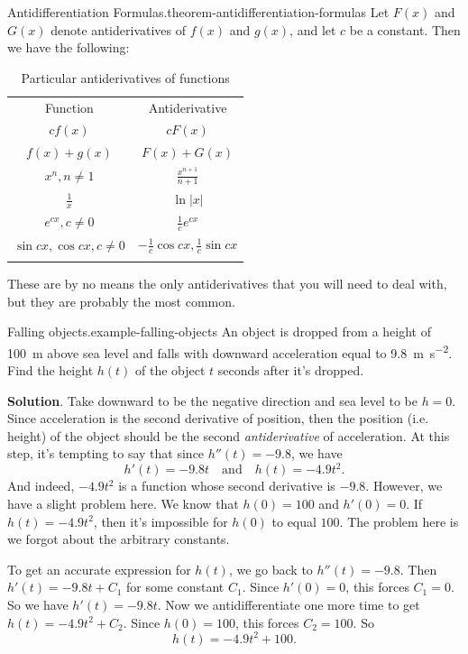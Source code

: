 \documentclass[10pt,]{book}
\numberwithin{equation}{section}
\newcommand{\hrulethin}  {\noalign{\hrule height 0.04em}}
\newcommand{\hrulethick} {\noalign{\hrule height 0.11em}}
\begin{document}
\begin{theorem}{Antidifferentiation Formulas.}{}{theorem-antidifferentiation-formulas}%
\hypertarget{p-392}{}%
Let \(F(x)\) and \(G(x)\) denote antiderivatives of \(f(x)\) and \(g(x)\), and let \(c\) be a constant. Then we have the following: \begin{table}
\centering
\begin{tabular}{cc}\hrulethick
Function&Antiderivative\tabularnewline\hrulethin
\(cf(x)\)&\(cF(x)\)\tabularnewline[0pt]
\(f(x) + g(x)\)&\(F(x) + G(x)\)\tabularnewline[0pt]
\(x^{n}, n\neq1\)&\(\frac{x^{n+1}}{n+1}\)\tabularnewline[0pt]
\(\frac{1}{x}\)&\(\ln|x|\)\tabularnewline[0pt]
\(e^{cx}, c\neq0\)&\(\frac{1}{c}e^{cx}\)\tabularnewline[0pt]
\(\sin cx, \cos cx, c\neq 0\)&\(-\frac{1}{c}\cos cx, \frac{1}{c}\sin cx\)\tabularnewline\hrulethick
\end{tabular}
\caption{Particular antiderivatives of functions\label{table-antiderivatives}}
\end{table}
 These are by no means the only antiderivatives that you will need to deal with, but they are probably the most common.%
\end{theorem}
\begin{example}{Falling objects.}{example-falling-objects}%
\hypertarget{p-393}{}%
An object is dropped from a height of \SI{100}{\meter} above sea level and falls with downward acceleration equal to \SI{9.8}{\meter\per\second\tothe{2}}. Find the height \(h(t)\) of the object \(t\) seconds after it's dropped.%
\par\smallskip%
\noindent\textbf{Solution}.\hypertarget{solution-88}{}\quad%
\hypertarget{p-394}{}%
Take downward to be the negative direction and sea level to be \(h=0\). Since acceleration is the second derivative of position, then the position (i.e. height) of the object should be the second \emph{antiderivative} of acceleration. At this step, it's tempting to say that since \(h''(t) = -9.8\), we have%
\begin{equation*}
h'(t) = -9.8t\quad\text{and}\quad h(t) = -4.9 t^{2}\text{.}
\end{equation*}
And indeed, \(-4.9t^{2}\) is a function whose second derivative is \(-9.8\). However, we have a slight problem here. We know that \(h(0) = 100\) and \(h'(0) = 0\). If \(h(t) = -4.9t^{2}\), then it's impossible for \(h(0)\) to equal \(100\). The problem here is we forgot about the arbitrary constants.%
\par
\hypertarget{p-395}{}%
To get an accurate expression for \(h(t)\), we go back to \(h''(t) = -9.8\). Then \(h'(t) = -9.8t+C_{1}\) for some constant \(C_{1}\). Since \(h'(0) = 0\), this forces \(C_{1} = 0\). So we have \(h'(t) = -9.8t\). Now we antidifferentiate one more time to get \(h(t) = -4.9t^{2} + C_{2}\). Since \(h(0) = 100\), this forces \(C_{2} = 100\). So%
\begin{equation*}
h(t) = -4.9t^{2} + 100\text{.}
\end{equation*}
%
\end{example}
\end{document}
